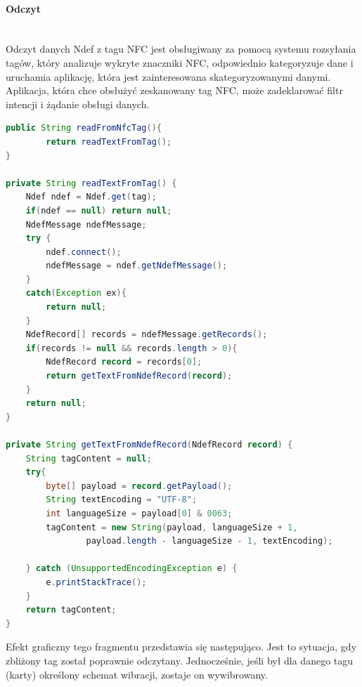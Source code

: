 \paragraph{Odczyt}\mbox{}\\
Odczyt danych Ndef z tagu NFC jest obsługiwany za pomocą systemu rozsyłania tagów, który analizuje wykryte znaczniki NFC, odpowiednio kategoryzuje dane i uruchamia aplikację, która jest zainteresowana skategoryzowanymi danymi. Aplikacja, która chce obsłużyć zeskanowany tag NFC, może zadeklarować filtr intencji i żądanie obsługi danych.
\begin{lstlisting}[language=Java]
public String readFromNfcTag(){
        return readTextFromTag();
}

private String readTextFromTag() {
    Ndef ndef = Ndef.get(tag);
    if(ndef == null) return null;
    NdefMessage ndefMessage;
    try {
        ndef.connect();
        ndefMessage = ndef.getNdefMessage();
    }
    catch(Exception ex){
        return null;
    }
    NdefRecord[] records = ndefMessage.getRecords();
    if(records != null && records.length > 0){
        NdefRecord record = records[0];
        return getTextFromNdefRecord(record);
    }
    return null;
}

private String getTextFromNdefRecord(NdefRecord record) {
    String tagContent = null;
    try{
        byte[] payload = record.getPayload();
        String textEncoding = "UTF-8";
        int languageSize = payload[0] & 0063;
        tagContent = new String(payload, languageSize + 1,
                payload.length - languageSize - 1, textEncoding);

    } catch (UnsupportedEncodingException e) {
        e.printStackTrace();
    }
    return tagContent;
}
\end{lstlisting}
Efekt graficzny tego fragmentu przedstawia się następująco. Jest to sytuacja, gdy zbliżony tag został poprawnie odczytany. Jednocześnie, jeśli był dla danego tagu (karty) określony schemat wibracji, zostaje on wywibrowany.
